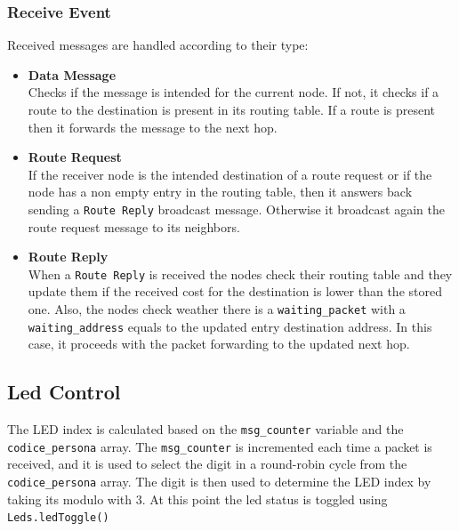 \documentclass[11pt]{article}
\begin{document}
\subsubsection*{Receive Event}
Received messages are handled according to their type:
\begin{itemize}
	\item{\textbf{Data Message}}\\
		Checks if the message is intended for the current node. If not, it checks if a route to the destination is present in its routing table. If a route is present then it forwards the message to the next hop.
	\item{\textbf{Route Request}}\\
		If the receiver node is the intended destination of a route request or if the node has a non empty entry in the routing table, then it answers back sending a \texttt{Route Reply} broadcast message.
		Otherwise it broadcast again the route request message to its neighbors.
		
	\item{\textbf{Route Reply}}\\
		When a \texttt{Route Reply} is received the nodes check their routing table and they update them if the received cost for the destination is lower than the stored one.
		Also, the nodes check weather there is a \texttt{waiting\_packet} with a \texttt{waiting\_address} equals to the updated entry destination address.
		In this case, it proceeds with the packet forwarding to the updated next hop.
\end{itemize}
\subsection*{Led Control}
The LED index is calculated based on the \texttt{msg\_counter} variable and the \texttt{codice\_persona} array. The \texttt{msg\_counter} is incremented each time a packet is received, and it is used to select the digit in a round-robin cycle from the \texttt{codice\_persona} array. The digit is then used to determine the LED index by taking its modulo with 3. At this point the led status is toggled using \texttt{Leds.ledToggle()}
\end{document}
